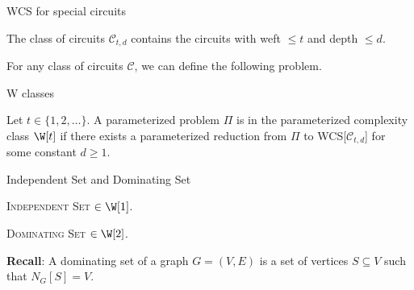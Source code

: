 \begin{frame}{WCS for special circuits}
	\begin{definition}
	The class of circuits $\mathcal{C}_{t,d}$ contains the circuits with weft $\le t$ and depth $\le d$.
	\end{definition}
	
	\noindent
	For any class of circuits $\mathcal{C}$, we can define the following problem.
\end{frame}

\begin{frame}{W classes}
	
	\begin{definition}[W-hierarchy]
		Let $t\in \{1,2,\dots \}$.
		A parameterized problem $\Pi$ is in the parameterized complexity class $\W[t]$ if there exists a parameterized reduction from $\Pi$ to WCS[$\mathcal{C}_{t,d}$] for some constant $d\ge 1$.
	\end{definition}
	
\end{frame}

\begin{frame}{Independent Set and Dominating Set}
	
	\begin{theorem}
		\textsc{Independent Set} $\in \W[1]$.
	\end{theorem}
	\begin{theorem}
		\textsc{Dominating Set} $\in \W[2]$.
	\end{theorem}
	
	\noindent
	\textbf{Recall}: A \alert{dominating set} of a graph $G=(V,E)$ is a set of vertices $S\subseteq V$ such that $N_G[S]=V$.
\end{frame}

